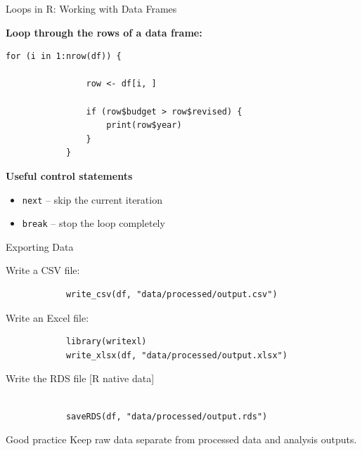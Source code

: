 \documentclass[aspectratio=169,11pt]{beamer}
\begin{document}
	\begin{frame}[fragile]{Loops in R: Working with Data Frames}
		
		\textbf{Loop through the rows of a data frame:}
		
		\begin{lstlisting}[basicstyle=\small\ttfamily]
			for (i in 1:nrow(df)) {
				
				row <- df[i, ]
				
				if (row$budget > row$revised) {
					print(row$year)
				}
			}
		\end{lstlisting}
		
		\vspace{0.2cm}
		
		\textbf{Useful control statements}
		
		\begin{itemize}
			\item \texttt{next} -- skip the current iteration
			\item \texttt{break} -- stop the loop completely
		\end{itemize}
		
		
	\end{frame}
	
	
	
	\begin{frame}[fragile]{Exporting Data}
		
		Write a CSV file:
		
		\begin{lstlisting}
			write_csv(df, "data/processed/output.csv")
		\end{lstlisting}
		
		Write an Excel file:
		
		\begin{lstlisting}
			library(writexl)
			write_xlsx(df, "data/processed/output.xlsx")
		\end{lstlisting}
		
		Write the RDS file [R native data]
				\begin{lstlisting}
	
			saveRDS(df, "data/processed/output.rds")
		\end{lstlisting}
		
		\vspace{0.3cm}
		
		\begin{block}{Good practice}
			Keep raw data separate from processed data and analysis outputs.
		\end{block}
		
	\end{frame}
	
\end{document}
